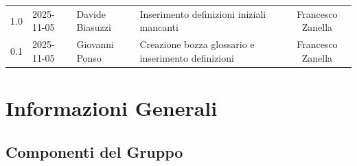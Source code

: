 \documentclass[a4paper, 11pt, oneside]{scrartcl} %
\begin{document}
\begin{center}
{\begin{tabular}{@{}llp{}p{}c@{}}
            1.0                                                                                                                                                            & 2025-11-05      & Davide Biasuzzi   & Inserimento definizioni iniziali mancanti                                                                                                                                                                                                                                                                                                                                                                                                & Francesco Zanella     \\
            0.1                                                                                                                                                            & 2025-11-05      & Giovanni Ponso    & Creazione bozza glossario e inserimento definizioni                                                                                                                                                                                                                                                                                                                                                                                      & Francesco Zanella     \\
            \bottomrule
        \end{tabular}
    }
\end{center}


\newpage
\tableofcontents %
\pagestyle{fancy}

\newpage
\section{Informazioni Generali}

\subsection{Componenti del Gruppo}
\end{document}
